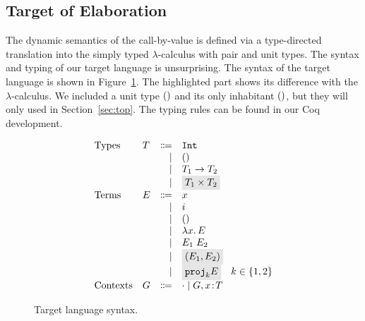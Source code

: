 
\subsection{Target of Elaboration}
The dynamic semantics of the call-by-value \name is defined via a
type-directed translation into the simply typed $\lambda$-calculus
with pair and unit types. 
The syntax and typing of our target language is unsurprising. The syntax of the
target language is shown in Figure~\ref{fig:f-syntax}. The highlighted part
shows its difference with the $\lambda$-calculus.
We included a unit type $()$ and its only inhabitant $()$, 
but they will only used in Section~\ref{sec:top}.
The typing rules can be found in our Coq development.

\begin{figure}[t]
  \[
    \begin{array}{llrl}
      \text{Types}    & T & \Coloneqq & \code{Int} \\
                      &   & \mid      & \unit \\
                      &   & \mid      & {T_1} \to {T_2} \\
                      &   & \mid      & \highlight {$ \tpair {T_1} {T_2} $} \\
      \text{Terms}    & E & \Coloneqq & x \\
                      &   & \mid      & i \\
                      &   & \mid      & \unit \\
                      &   & \mid      & \lamty x T E \\
                      &   & \mid      & \app {E_1} {E_2} \\
                      &   & \mid      & \highlight {$ \pair {E_1} {E_2} $} \\
                      &   & \mid      & \highlight {$ \proj k E $} \quad k \in \{ 1, 2 \} \\
      \text{Contexts} & G & \Coloneqq & \cdot \mid G, x \oftype T \\
    \end{array}
  \]
  \caption{Target language syntax.}
  \label{fig:f-syntax}
\end{figure}

